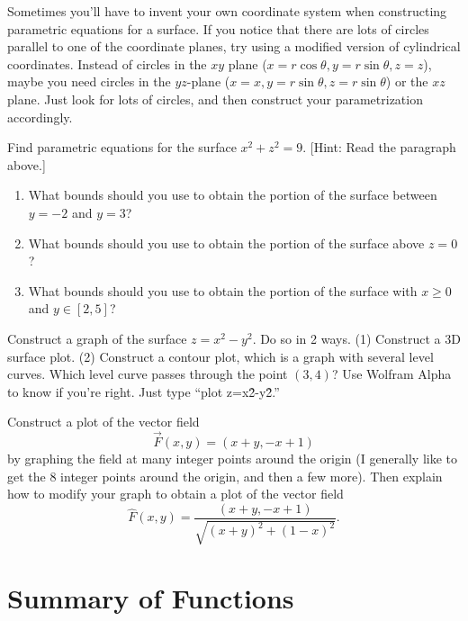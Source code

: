 Sometimes you'll have to invent your own coordinate system when constructing parametric equations for a surface.  If you notice that there are lots of circles parallel to one of the coordinate planes, try using a modified version of cylindrical coordinates. Instead of circles in the $xy$ plane ($x=r\cos\theta,y=r\sin\theta,z=z$), maybe you need circles in the $yz$-plane ($x=x,y=r\sin\theta,z=r\sin\theta$) or the $xz$ plane.  Just look for lots of circles, and then construct your parametrization accordingly.
\begin{challenge}
%
Find parametric equations for the surface $x^2+z^2=9$. [Hint: Read the paragraph above.]  
\begin{enumerate}
 \item{}%
 What bounds should you use to obtain the portion of the surface between $y=-2$ and $y=3$?
 \item What bounds should you use to obtain the portion of the surface above $z=0$?
 \item What bounds should you use to obtain the portion of the surface with $x\geq 0$ and $y\in[2,5]$?
\end{enumerate}
\end{challenge}

\begin{challenge}
 Construct a graph of the surface $z = x^2-y^2$.  Do so in 2 ways.  (1) Construct a 3D surface plot.  (2) Construct a contour plot, which is a graph with several level curves. Which level curve passes through the point $(3,4)$? 
 Use Wolfram Alpha to know if you're right.  Just type ``plot z=x\^2-y\^2.''
\end{challenge}

\begin{challenge}
Construct a plot of the vector field $$\vec F(x,y) = (x+y, -x+1)$$ by graphing the field at many integer points around the origin (I generally like to get the 8 integer points around the origin, and then a few more).
Then explain how to modify your graph to obtain a plot of the vector field $$\hat F(x,y) = \frac{(x+y, -x+1)}{\sqrt{(x+y)^2+(1-x)^2}}.$$ 
\end{challenge}

\newpage

\section{Summary of Functions}\label{sec:functionlist}


